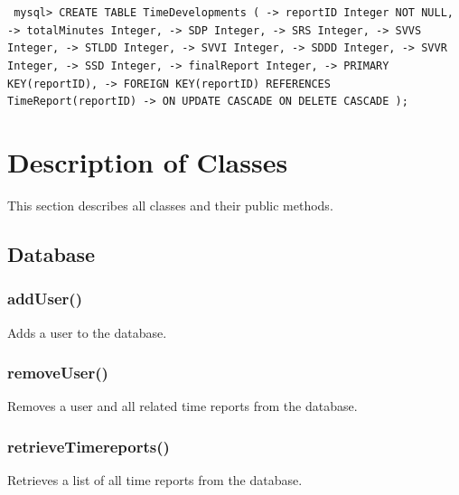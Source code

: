 \documentclass{article}
\begin{document}
\small
\texttt{
\noindent mysql> CREATE TABLE TimeDevelopments (\newline
\indent\indent\indent -> reportID Integer NOT NULL,\newline
\indent\indent\indent -> totalMinutes Integer,\newline
\indent\indent\indent -> SDP Integer,\newline
\indent\indent\indent -> SRS Integer,\newline
\indent\indent\indent -> SVVS Integer,\newline
\indent\indent\indent -> STLDD Integer,\newline
\indent\indent\indent -> SVVI Integer,\newline
\indent\indent\indent -> SDDD Integer,\newline
\indent\indent\indent -> SVVR Integer,\newline
\indent\indent\indent -> SSD Integer,\newline
\indent\indent\indent -> finalReport Integer,\newline
\indent\indent\indent -> PRIMARY KEY(reportID),\newline
\indent\indent\indent -> FOREIGN KEY(reportID) REFERENCES TimeReport(reportID)\newline
\indent\indent\indent -> ON UPDATE CASCADE ON DELETE CASCADE );\newline
}
\normalsize

\section{Description of Classes}
This section describes all classes and their public methods.

\subsection{Database}
\subsubsection{addUser()}
Adds a user to the database.
\subsubsection{removeUser()}
Removes a user and all related time reports from the database.
\subsubsection{retrieveTimereports()}
Retrieves a list of all time reports from the database.
\end{document}
